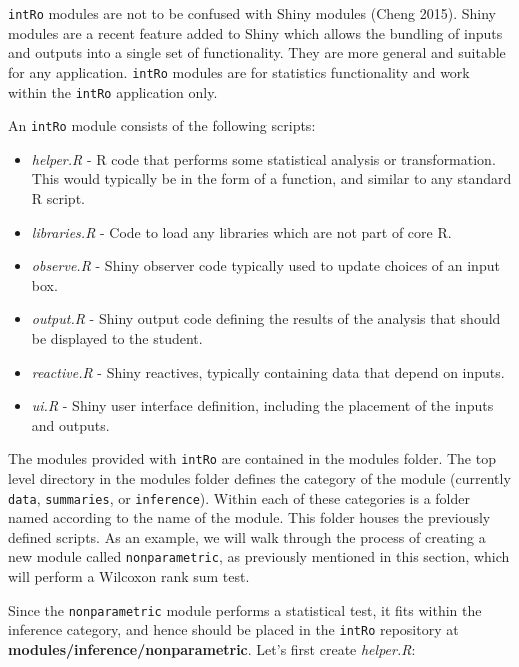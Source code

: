 \documentclass[12pt,]{article}
\providecommand{\tightlist}{%
  \setlength{\itemsep}{0pt}\setlength{\parskip}{0pt}}
\begin{document}
\texttt{intRo} modules are not to be confused with Shiny modules (Cheng
2015). Shiny modules are a recent feature added to Shiny which allows
the bundling of inputs and outputs into a single set of functionality.
They are more general and suitable for any application. \texttt{intRo}
modules are for statistics functionality and work within the
\texttt{intRo} application only.

An \texttt{intRo} module consists of the following scripts:

\begin{itemize}
\tightlist
\item
  \emph{helper.R} - R code that performs some statistical analysis or
  transformation. This would typically be in the form of a function, and
  similar to any standard R script.
\item
  \emph{libraries.R} - Code to load any libraries which are not part of
  core R.
\item
  \emph{observe.R} - Shiny observer code typically used to update
  choices of an input box.
\item
  \emph{output.R} - Shiny output code defining the results of the
  analysis that should be displayed to the student.
\item
  \emph{reactive.R} - Shiny reactives, typically containing data that
  depend on inputs.
\item
  \emph{ui.R} - Shiny user interface definition, including the placement
  of the inputs and outputs.
\end{itemize}

The modules provided with \texttt{intRo} are contained in the modules
folder. The top level directory in the modules folder defines the
category of the module (currently \texttt{data}, \texttt{summaries}, or
\texttt{inference}). Within each of these categories is a folder named
according to the name of the module. This folder houses the previously
defined scripts. As an example, we will walk through the process of
creating a new module called \texttt{nonparametric}, as previously
mentioned in this section, which will perform a Wilcoxon rank sum test.

Since the \texttt{nonparametric} module performs a statistical test, it
fits within the inference category, and hence should be placed in the
\texttt{intRo} repository at \textbf{modules/inference/nonparametric}.
Let's first create \emph{helper.R}:
\end{document}
